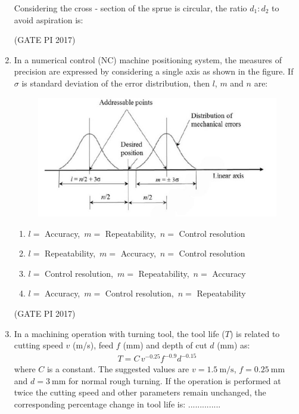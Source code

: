 \documentclass[journal,12pt,onecolumn]{IEEEtran}
\theoremstyle{remark}
\begin{document}
\begin{enumerate}
Considering the cross \-- section of the sprue is circular, the ratio $d_{1} : d_{2}$ to avoid aspiration is:

\begin{enumerate}
\end{enumerate}
\hfill (GATE PI 2017)

\item In a numerical control (NC) machine positioning system, the measures of precision are expressed by considering a single axis as shown in the figure.  
If $\sigma$ is standard deviation of the error distribution, then  $l$, $m$ and $n$ are:
\newpage
\begin{figure}[h]
    \centering
    \includegraphics[width=0.5\columnwidth]{fig11.png}
    \caption{}
    \label{fig:placeholder}
\end{figure}

\begin{enumerate}
\item $l=$ Accuracy,\ $m=$ Repeatability,\ $n=$ Control resolution
\item $l=$ Repeatability,\ $m=$ Accuracy,\ $n=$ Control resolution
\item $l=$ Control resolution,\ $m=$ Repeatability,\ $n=$ Accuracy
\item $l=$ Accuracy,\ $m=$ Control resolution,\ $n=$ Repeatability
\end{enumerate}
\hfill (GATE PI 2017)

\item In a machining operation with turning tool, the tool life ($T$) is related to cutting speed $v$ (m/s), feed $f$ (mm) and depth of cut $d$ (mm) as:  
\begin{align*}
T = C\, v^{-0.25} f^{-0.9} d^{-0.15}
\end{align*}
where $C$ is a constant. The suggested values are $v = 1.5 \ \text{m/s}$, $f = 0.25 \ \text{mm}$ and $d = 3 \ \text{mm}$ for normal rough turning.  
If the operation is performed at twice the cutting speed and other parameters remain unchanged,  
the corresponding percentage change in tool life is:  
..............


\end{enumerate}
\end{document}
